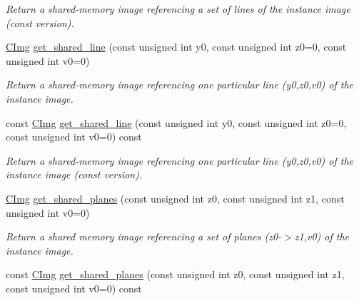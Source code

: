 \begin{DoxyCompactItemize}
\begin{DoxyCompactList}\small\item\em Return a shared-\/memory image referencing a set of lines of the instance image (const version). \end{DoxyCompactList}\item 
\hypertarget{structcimg__library_1_1_c_img_a6190f2f8a7f0c1f493dc70fcbab755d9}{\hyperlink{structcimg__library_1_1_c_img}{C\-Img} \hyperlink{structcimg__library_1_1_c_img_a6190f2f8a7f0c1f493dc70fcbab755d9}{get\-\_\-shared\-\_\-line} (const unsigned int y0, const unsigned int z0=0, const unsigned int v0=0)}\label{structcimg__library_1_1_c_img_a6190f2f8a7f0c1f493dc70fcbab755d9}

\begin{DoxyCompactList}\small\item\em Return a shared-\/memory image referencing one particular line (y0,z0,v0) of the instance image. \end{DoxyCompactList}\item 
\hypertarget{structcimg__library_1_1_c_img_a4e94690fd24c71e827a8e51d0a6b7ec1}{const \hyperlink{structcimg__library_1_1_c_img}{C\-Img} \hyperlink{structcimg__library_1_1_c_img_a4e94690fd24c71e827a8e51d0a6b7ec1}{get\-\_\-shared\-\_\-line} (const unsigned int y0, const unsigned int z0=0, const unsigned int v0=0) const }\label{structcimg__library_1_1_c_img_a4e94690fd24c71e827a8e51d0a6b7ec1}

\begin{DoxyCompactList}\small\item\em Return a shared-\/memory image referencing one particular line (y0,z0,v0) of the instance image (const version). \end{DoxyCompactList}\item 
\hypertarget{structcimg__library_1_1_c_img_a669a67979724edfc2d8c74b3e7134e75}{\hyperlink{structcimg__library_1_1_c_img}{C\-Img} \hyperlink{structcimg__library_1_1_c_img_a669a67979724edfc2d8c74b3e7134e75}{get\-\_\-shared\-\_\-planes} (const unsigned int z0, const unsigned int z1, const unsigned int v0=0)}\label{structcimg__library_1_1_c_img_a669a67979724edfc2d8c74b3e7134e75}

\begin{DoxyCompactList}\small\item\em Return a shared memory image referencing a set of planes (z0-\/$>$z1,v0) of the instance image. \end{DoxyCompactList}\item 
\hypertarget{structcimg__library_1_1_c_img_a3c3911fd31bc2b2b77085fae5a55cd4c}{const \hyperlink{structcimg__library_1_1_c_img}{C\-Img} \hyperlink{structcimg__library_1_1_c_img_a3c3911fd31bc2b2b77085fae5a55cd4c}{get\-\_\-shared\-\_\-planes} (const unsigned int z0, const unsigned int z1, const unsigned int v0=0) const }\label{structcimg__library_1_1_c_img_a3c3911fd31bc2b2b77085fae5a55cd4c}


\end{DoxyCompactItemize}

